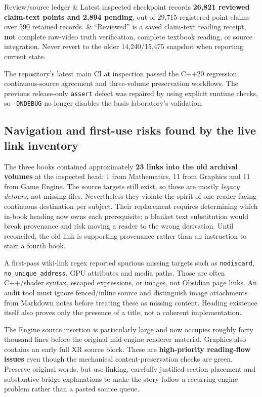 {\begin{longtable}[]
Review/source ledger & Latest inspected checkpoint records \textbf{26,821 reviewed claim-text points and 2,894 pending}, out of 29,715 registered point claims over 590 retained records. & ``Reviewed'' is a saved claim-text reading receipt, \textbf{not} complete raw-video truth verification, complete textbook reading, or source integration. Never revert to the older 14,240/15,475 snapshot when reporting current state. \\
\end{longtable}
}

The repository's latest main CI at inspection passed the C++20 regression, continuous-source agreement and three-volume preservation workflows. The previous release-only \texttt{assert} defect was repaired by using explicit runtime checks, so \texttt{-DNDEBUG} no longer disables the basis laboratory's validation.

\subsection{Navigation and first-use risks found by the live link inventory}\label{appendix-28e6f216fdc7-navigation-and-first-use-risks-found-by-the-live-link-inventory}

The three books contained approximately \textbf{23 links into the old archival volumes} at the inspected head: 1 from Mathematics, 11 from Graphics and 11 from Game Engine. The source targets still exist, so these are mostly \emph{legacy detours}, not missing files. Nevertheless they violate the spirit of one reader-facing continuous destination per subject. Their replacement requires determining which in-book heading now owns each prerequisite; a blanket text substitution would break provenance and risk moving a reader to the wrong derivation. Until reconciled, the old link is supporting provenance rather than an instruction to start a fourth book.

A first-pass wiki-link regex reported spurious missing targets such as \texttt{nodiscard}, \texttt{no\_unique\_address}, GPU attributes and media paths. Those are often C++/shader syntax, escaped expressions, or images, not Obsidian page links. An audit tool must ignore fenced/inline source and distinguish image attachments from Markdown notes before treating these as missing content. Heading existence itself also proves only the presence of a title, not a coherent implementation.

The Engine source insertion is particularly large and now occupies roughly forty thousand lines before the original mid-engine renderer material. Graphics also contains an early full XR source block. These are \textbf{high-priority reading-flow issues} even though the mechanical content-preservation checks are green. Preserve original words, but use linking, carefully justified section placement and substantive bridge explanations to make the story follow a recurring engine problem rather than a pasted source queue.

